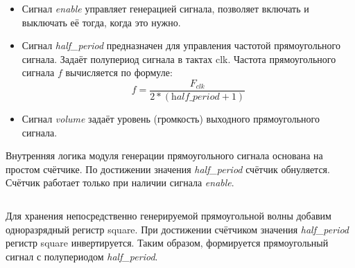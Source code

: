 % 	


\begin{listing}[H]
	\inputminted[firstline=1, lastline=11]{SystemVerilog}{code_examples/lab_7/square_code.sv}
\end{listing}


\begin{itemize}
	\item Сигнал \textit{enable} управляет генерацией сигнала, позволяет включать и выключать её тогда, когда это нужно.
	\item Сигнал \textit{half\_period} предназначен для управления частотой прямоугольного сигнала. Задаёт полупериод сигнала в тактах clk. Частота прямоугольного сигнала $f$ вычисляется по формуле: 
	$$ f = \frac{F_{clk}}{2* (\textit{half\_period} + 1)} $$
	\item Сигнал \textit{volume} задаёт уровень (громкость) выходного прямоугольного сигнала.

\end{itemize}


Внутренняя логика модуля генерации прямоугольного сигнала основана на простом счётчике. По достижении значения \textit{half\_period} счётчик обнуляется. Счётчик работает только при наличии сигнала \textit{enable}.

% 	


\begin{listing}[H]
	\inputminted[firstline=12, lastline=22]{SystemVerilog}{code_examples/lab_7/square_code.sv}
\end{listing}


Для хранения непосредственно генерируемой прямоугольной волны добавим одноразрядный регистр square.
При достижении счётчиком значения \textit{half\_period} регистр square инвертируется. Таким образом, формируется прямоугольный сигнал с полупериодом \textit{half\_period}.

% 	

